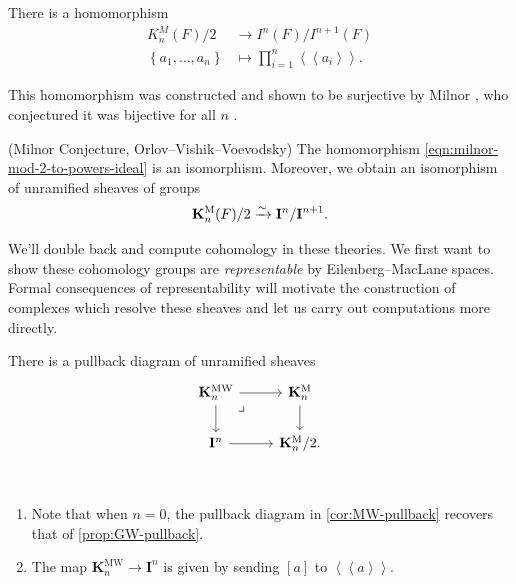 \documentclass[11pt,openany]{book}
\providecommand{\KM}{\mathbf{K}^\mathrm{M}}
\providecommand{\KMW}{\mathbf{K}^\mathrm{MW}}
\newcommand{\Pfister}[1]{\left\langle\! \left\langle #1 \right\rangle\! \right\rangle}
\begin{document}
\begin{proposition} There is a homomorphism
\begin{equation}\label{eqn:milnor-mod-2-to-powers-ideal}
\begin{aligned}
    K_n^M(F)/2 &\to I^n(F)/I^{n+1}(F) \\
    \left\{ a_1, \ldots, a_n \right\} &\mapsto \prod_{i=1}^n \Pfister{a_i}.
\end{aligned}
\end{equation}
\end{proposition}

This homomorphism was constructed and shown to be surjective by Milnor \cite[4.1]{MilnorK}, who conjectured it was bijective for all $n$ \cite[4.3]{MilnorK}.


\begin{theorem} (Milnor Conjecture, Orlov--Vishik--Voevodsky) The homomorphism \autoref{eqn:milnor-mod-2-to-powers-ideal} is an isomorphism. Moreover, we obtain an isomorphism of unramified sheaves of groups
\begin{align*}
    \KM_n(F)/2 \xto{\sim} \mathbf{I}^n/\mathbf{I}^{n+1}.
\end{align*}
\end{theorem}

\begin{motivation} We'll double back and compute cohomology in these theories. We first want to show these cohomology groups are \textit{representable} by Eilenberg--MacLane spaces. Formal consequences of representability will motivate the construction of complexes which resolve these sheaves and let us carry out computations more directly.
\end{motivation}

\begin{corollary}\label{cor:MW-pullback} 
There is a pullback diagram of unramified sheaves
\[ \begin{tikzcd}
    \KMW_n\rar\dar\pb & \KM_n\dar\\
    \mathbf{I}^n\rar & \KM_n/2.
\end{tikzcd} \]
\end{corollary}

\begin{remark} $\ $
\begin{enumerate}
    \item Note that when $n=0$, the pullback diagram in \autoref{cor:MW-pullback} recovers that of \autoref{prop:GW-pullback}.
    \item The map $\KMW_n \to \mathbf{I}^n$ is given by sending $[a]$ to $\Pfister{a}$.
\end{enumerate}
\end{remark}
\end{document}
